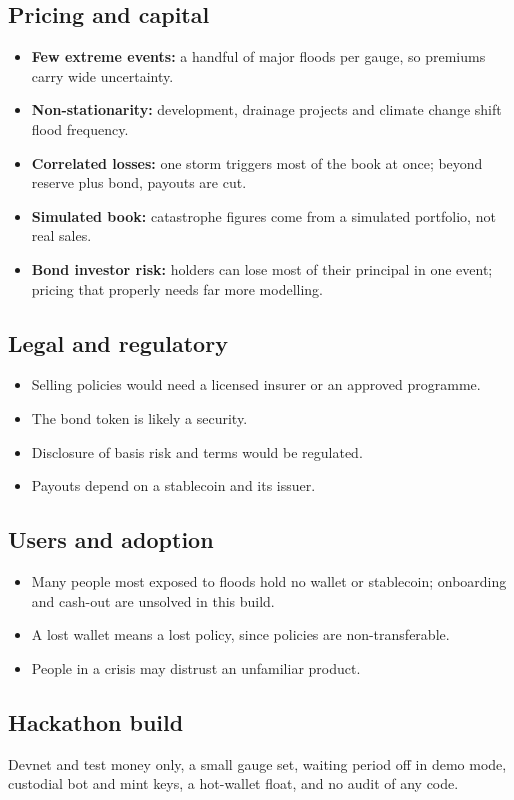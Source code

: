\documentclass[11pt]{article}
\begin{document}
\subsection{Pricing and capital}
\begin{itemize}
\item \textbf{Few extreme events:} a handful of major floods per gauge, so premiums carry wide uncertainty.
\item \textbf{Non-stationarity:} development, drainage projects and climate change shift flood frequency.
\item \textbf{Correlated losses:} one storm triggers most of the book at once; beyond reserve plus bond, payouts are cut.
\item \textbf{Simulated book:} catastrophe figures come from a simulated portfolio, not real sales.
\item \textbf{Bond investor risk:} holders can lose most of their principal in one event; pricing that properly needs far more modelling.
\end{itemize}

\subsection{Legal and regulatory}
\begin{itemize}
\item Selling policies would need a licensed insurer or an approved programme.
\item The bond token is likely a security.
\item Disclosure of basis risk and terms would be regulated.
\item Payouts depend on a stablecoin and its issuer.
\end{itemize}

\subsection{Users and adoption}
\begin{itemize}
\item Many people most exposed to floods hold no wallet or stablecoin; onboarding and cash-out are unsolved in this build.
\item A lost wallet means a lost policy, since policies are non-transferable.
\item People in a crisis may distrust an unfamiliar product.
\end{itemize}

\subsection{Hackathon build}
Devnet and test money only, a small gauge set, waiting period off in demo mode, custodial bot and mint keys, a hot-wallet float, and no audit of any code.
\end{document}

